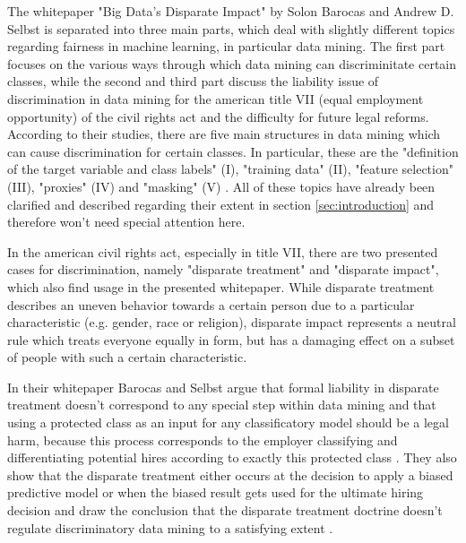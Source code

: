The whitepaper "Big Data’s Disparate Impact" \cite{Barocas.2016} by Solon Barocas and 
Andrew D. Selbst is separated into three main parts, which deal with slightly different 
topics regarding fairness in machine learning, in particular data mining. The first part 
focuses on the various ways through which data mining can discriminitate certain classes, 
while the second and third part discuss the liability issue of discrimination in data 
mining for the american title VII (equal employment opportunity) \cite{titleVII} of the 
civil rights act and the difficulty for future legal reforms.  According to their studies, there are five main structures in data mining which can 
cause discrimination for certain classes. In particular, these are the "definition of 
the target variable and class labels" (I), "training data" (II), "feature selection" (III), 
"proxies" (IV) and "masking" (V) \cite{Barocas.2016}. All of these topics have already 
been clarified and described regarding their extent in section \ref{sec:introduction} and 
therefore won't need special attention here.

In the american civil rights act, especially in title VII, there are two presented cases 
for discrimination, namely "disparate treatment" and "disparate impact", which also find 
usage in the presented whitepaper. While disparate treatment describes an uneven behavior 
towards a certain person due to a particular characteristic (e.g. gender, race or 
religion), disparate impact represents a neutral rule which treats everyone equally in 
form, but has a damaging effect on a subset of people with such a certain characteristic.

In their whitepaper Barocas and Selbst argue that formal liability in disparate treatment 
doesn't correspond to any special step within data mining and that using a protected 
class as an input for any classificatory model should be a legal harm, because this 
process corresponds to the employer classifying and differentiating potential hires 
according to exactly this protected class \cite{Barocas.2016}. They also show that the 
disparate treatment either occurs at the decision to apply  a biased predictive model 
or when the biased result gets used for the ultimate hiring decision and draw the 
conclusion that the disparate treatment doctrine doesn't regulate discriminatory 
data mining to a satisfying extent \cite{Barocas.2016}. 

